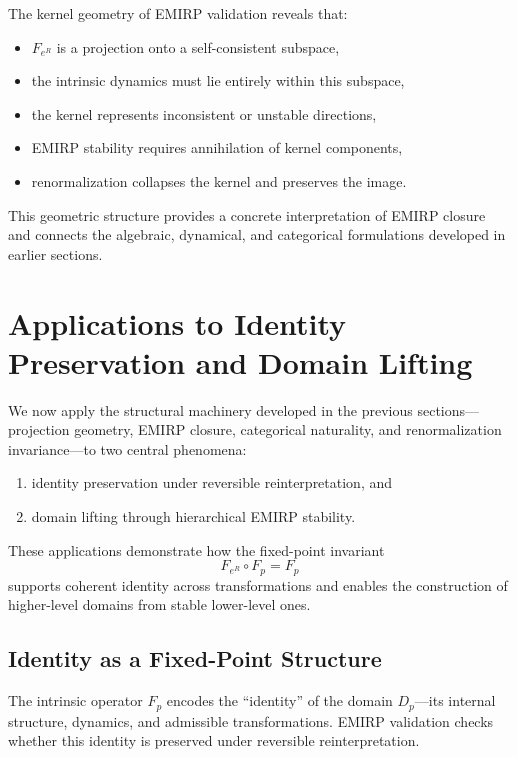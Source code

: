 \documentclass[11pt]{article}
\theoremstyle{definition}
\theoremstyle{plain}
\theoremstyle{remark}
\begin{document}
The kernel geometry of EMIRP validation reveals that:

\begin{itemize}
    \item $F_{e^R}$ is a projection onto a self-consistent subspace,
    \item the intrinsic dynamics must lie entirely within this subspace,
    \item the kernel represents inconsistent or unstable directions,
    \item EMIRP stability requires annihilation of kernel components,
    \item renormalization collapses the kernel and preserves the image.
\end{itemize}

This geometric structure provides a concrete interpretation of EMIRP
closure and connects the algebraic, dynamical, and categorical
formulations developed in earlier sections.

\section{Applications to Identity Preservation and Domain Lifting}

We now apply the structural machinery developed in the previous
sections—projection geometry, EMIRP closure, categorical naturality, and
renormalization invariance—to two central phenomena:

\begin{enumerate}
    \item identity preservation under reversible reinterpretation, and
    \item domain lifting through hierarchical EMIRP stability.
\end{enumerate}

These applications demonstrate how the fixed-point invariant
\[
F_{e^R} \circ F_p = F_p
\]
supports coherent identity across transformations and enables the
construction of higher-level domains from stable lower-level ones.

\subsection{Identity as a Fixed-Point Structure}

The intrinsic operator $F_p$ encodes the ``identity'' of the domain
$D_p$—its internal structure, dynamics, and admissible transformations.
EMIRP validation checks whether this identity is preserved under
reversible reinterpretation.
\end{document}
